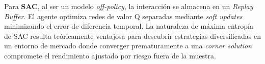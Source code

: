 Para \textbf{SAC}, al ser un modelo \textit{off-policy}, la interacción se almacena en un \textit{Replay Buffer}. El agente optimiza redes de valor Q separadas mediante \textit{soft updates} minimizando el error de diferencia temporal. La naturaleza de máxima entropía de SAC resulta teóricamente ventajosa para descubrir estrategias diversificadas en un entorno de mercado donde converger prematuramente a una \textit{corner solution} compromete el rendimiento ajustado por riesgo fuera de la muestra.
